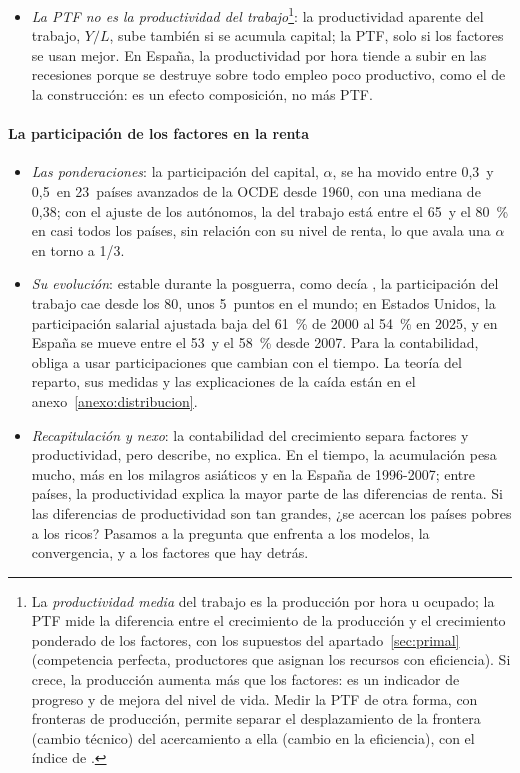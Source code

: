 \documentclass[11pt]{article}
\begin{document}
\begin{itemize}
\begin{itemize}
  \end{itemize}
\item \emph{La PTF no es la productividad del trabajo}\footnote{La \emph{productividad media} del trabajo es la producción por hora u ocupado; la PTF mide la diferencia entre el crecimiento de la producción y el crecimiento ponderado de los factores, con los supuestos del apartado~\ref{sec:primal} (competencia perfecta, productores que asignan los recursos con eficiencia). Si crece, la producción aumenta más que los factores: es un indicador de progreso y de mejora del nivel de vida. Medir la PTF de otra forma, con fronteras de producción, permite separar el desplazamiento de la frontera (cambio técnico) del acercamiento a ella (cambio en la eficiencia), con el índice de  .}: la productividad aparente del trabajo, $Y/L$, sube también si se acumula capital; la PTF, solo si los factores se usan mejor. En España, la productividad por hora tiende a subir en las recesiones porque se destruye sobre todo empleo poco productivo, como el de la construcción: es un efecto composición, no más PTF.
\end{itemize}

\paragraph{La participación de los factores en la renta}

\begin{itemize}
\item \emph{Las ponderaciones}: la participación del capital, $\alpha$, se ha movido entre 0,3~y 0,5~en 23~países avanzados de la OCDE desde 1960, con una mediana de 0,38\nocite{GGDC2025PWT}; con el ajuste de los autónomos, la del trabajo está entre el 65~y el 80~\% en casi todos los países, sin relación con su nivel de renta, lo que avala una $\alpha$ en torno a 1/3\nocite{Gollin2002}.
\item \emph{Su evolución}: estable durante la posguerra, como decía , la participación del trabajo cae desde los 80, unos 5~puntos en el mundo\nocite{KarabarbounisNeiman2014}; en Estados Unidos, la participación salarial ajustada baja del 61~\% de 2000 al 54~\% en 2025, y en España se mueve entre el 53~y el 58~\% desde 2007\nocite{CE2026AMECO}. Para la contabilidad, obliga a usar participaciones que cambian con el tiempo. La teoría del reparto, sus medidas y las explicaciones de la caída están en el anexo~\ref{anexo:distribucion}.
\item \emph{Recapitulación y nexo}: la contabilidad del crecimiento separa factores y productividad, pero describe, no explica. En el tiempo, la acumulación pesa mucho, más en los milagros asiáticos y en la España de 1996-2007; entre países, la productividad explica la mayor parte de las diferencias de renta. Si las diferencias de productividad son tan grandes, ¿se acercan los países pobres a los ricos? Pasamos a la pregunta que enfrenta a los modelos, la convergencia, y a los factores que hay detrás.
\end{itemize}
\end{document}
